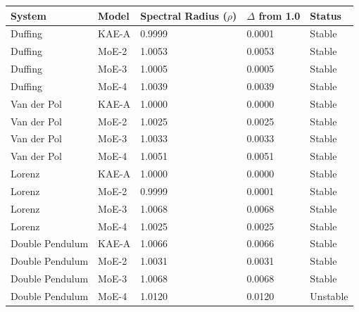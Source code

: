 \begin{tabular}{lllll}
\toprule
System & Model & Spectral Radius ($\rho$) & $\Delta$ from 1.0 & Status \\
\midrule
Duffing & KAE-A & 0.9999 & 0.0001 & Stable \\
Duffing & MoE-2 & 1.0053 & 0.0053 & Stable \\
Duffing & MoE-3 & 1.0005 & 0.0005 & Stable \\
Duffing & MoE-4 & 1.0039 & 0.0039 & Stable \\
Van der Pol & KAE-A & 1.0000 & 0.0000 & Stable \\
Van der Pol & MoE-2 & 1.0025 & 0.0025 & Stable \\
Van der Pol & MoE-3 & 1.0033 & 0.0033 & Stable \\
Van der Pol & MoE-4 & 1.0051 & 0.0051 & Stable \\
Lorenz & KAE-A & 1.0000 & 0.0000 & Stable \\
Lorenz & MoE-2 & 0.9999 & 0.0001 & Stable \\
Lorenz & MoE-3 & 1.0068 & 0.0068 & Stable \\
Lorenz & MoE-4 & 1.0025 & 0.0025 & Stable \\
Double Pendulum & KAE-A & 1.0066 & 0.0066 & Stable \\
Double Pendulum & MoE-2 & 1.0031 & 0.0031 & Stable \\
Double Pendulum & MoE-3 & 1.0068 & 0.0068 & Stable \\
Double Pendulum & MoE-4 & 1.0120 & 0.0120 & Unstable \\
\bottomrule
\end{tabular}
